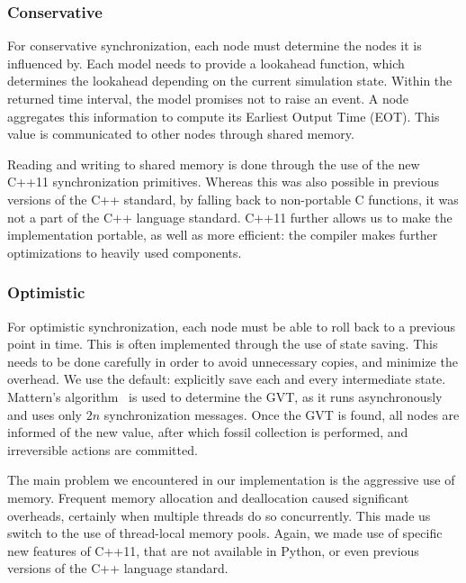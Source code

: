\subsubsection{Conservative}
For conservative synchronization, each node must determine the nodes it is influenced by.
Each model needs to provide a lookahead function, which determines the lookahead depending on the current simulation state.
Within the returned time interval, the model promises not to raise an event.
A node aggregates this information to compute its Earliest Output Time (EOT).
This value is communicated to other nodes through shared memory.

Reading and writing to shared memory is done through the use of the new C++11 synchronization primitives.
Whereas this was also possible in previous versions of the C++ standard, by falling back to non-portable C functions, it was not a part of the C++ language standard.
C++11 further allows us to make the implementation portable, as well as more efficient: the compiler makes further optimizations to heavily used components.

\subsubsection{Optimistic}
For optimistic synchronization, each node must be able to roll back to a previous point in time.
This is often implemented through the use of state saving.
This needs to be done carefully in order to avoid unnecessary copies, and minimize the overhead.
We use the default: explicitly save each and every intermediate state.
Mattern's algorithm~\cite{mattern} is used to determine the GVT, as it runs asynchronously and uses only $2n$ synchronization messages.
Once the GVT is found, all nodes are informed of the new value, after which fossil collection is performed, and irreversible actions are committed.

The main problem we encountered in our implementation is the aggressive use of memory.
Frequent memory allocation and deallocation caused significant overheads, certainly when multiple threads do so concurrently.
This made us switch to the use of thread-local %
 memory pools.
Again, we made use of specific new features of C++11, that are not available in Python, or even previous versions of the C++ language standard.


